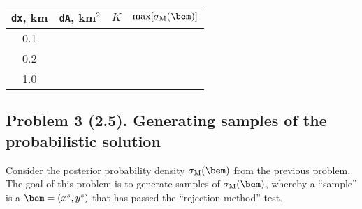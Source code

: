 \documentclass[11pt,titlepage,fleqn]{article}
\begin{document}
\begin{spacing}{2.0}
\centering
\begin{tabular}{c|c|c|c}
\hline\hline
\verb+dx+, km & \verb+dA+, km$^2$ & $K$ & $\max[\sigma_{\rm M}(\bem)]$ \\ \hline\hline
0.1 & \hspace{0.5cm} & \hspace{3cm} & \hspace{4cm}  \\ \hline
0.2 & & &  \\ \hline
1.0 & & &  \\ \hline
\end{tabular}
\end{spacing}


\pagebreak
\subsection*{Problem 3 (2.5). Generating samples of the probabilistic solution}

Consider the posterior probability density $\sigma_{\rm M}(\bem)$ from the previous problem. The goal of this problem is to generate samples of $\sigma_{\rm M}(\bem)$, whereby a ``sample'' is a $\bem = (x^s,y^s)$ that has passed the ``rejection method'' test.
\end{document}
